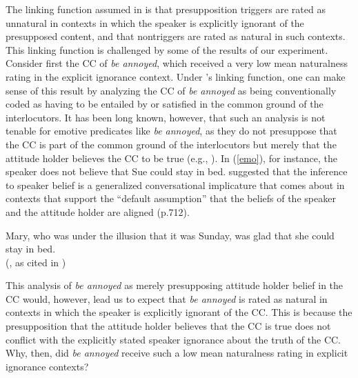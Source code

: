 \documentclass[11pt,fleqn]{article}
\newcommand{\6}{\mbox{$[\hspace*{-.6mm}[$}}
\newcommand{\9}{\mbox{$]\hspace*{-.6mm}]$}}
\newcommand{\citepos}[1]{\citeauthor{#1}'s \citeyear{#1}}
\begin{document}
The linking function assumed in \citealt{mandelkern-etal2020} is that presupposition triggers are rated as unnatural in contexts in which the speaker is explicitly ignorant of the presupposed content, and that nontriggers are rated as natural in such contexts. This linking function is challenged by some of the results of our experiment. Consider first the CC of {\em be annoyed}, which received a very low mean naturalness rating in the explicit ignorance context. Under \citepos{mandelkern-etal2020} linking function, one can make sense of this result by analyzing the CC of {\em be annoyed} as being conventionally coded as having to be entailed by or satisfied in the common ground of the interlocutors. It has been long known, however, that such an analysis is not tenable for emotive predicates like {\em be annoyed}, as they do not presuppose that the CC is part of the common ground of the interlocutors but merely that the attitude holder believes the CC to be true (e.g., \citealt{heim92,karttunen2016}). In (\ref{emo}), for instance, the speaker does not believe that Sue could stay in bed.  \citealt{karttunen2016} suggested that the inference to speaker belief is a generalized conversational implicature that comes about in contexts that support the ``default assumption'' that the beliefs of the speaker and the attitude holder are aligned (p.712).

\begin{exe}
\ex\label{emo} 
Mary, who was under the illusion that it was Sunday, was glad that she could stay in bed. \\ \hspace*{.2cm} \hfill (\citealt{klein1975}, as cited in \citealt[122]{gazdar79a})
\end{exe}
This analysis of {\em be annoyed} as merely presupposing attitude holder belief in the CC would, however, lead us to expect that {\em be annoyed} is rated as natural in contexts in which the speaker is explicitly ignorant of the CC. This is because the presupposition that the attitude holder believes that the CC is true does not conflict with the explicitly stated speaker ignorance about the truth of the CC. Why, then, did {\em be annoyed} receive such a low mean naturalness rating in explicit ignorance contexts? 

\color{black}
\end{document}
